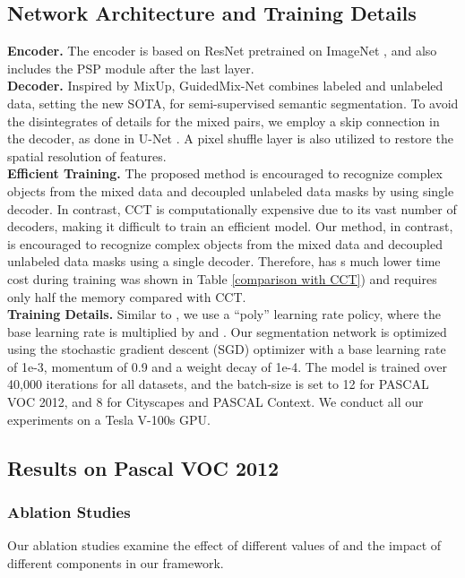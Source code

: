 \subsection{Network Architecture and Training Details}
\textbf{Encoder.} The encoder is based on ResNet \cite{he2016deep} pretrained on ImageNet \cite{krizhevsky2012imagenet}, and also includes the PSP module \cite{zhao2017pyramid} after the last layer.
\\\textbf{Decoder.} Inspired by MixUp, GuidedMix-Net combines labeled and unlabeled data, setting the new SOTA, for semi-supervised semantic segmentation. 
To avoid the disintegrates of details for the mixed pairs, we employ a skip connection in the decoder, as done in U-Net \cite{Ronneberger2015UNetCN}.
A pixel shuffle layer \cite{shi2016real} is also utilized to restore the spatial resolution of features.
\\\textbf{Efficient Training.} The proposed method is encouraged to recognize complex objects from the mixed data and decoupled unlabeled data masks by using single decoder.
In contrast, CCT \cite{ouali2020semi} is computationally expensive due to its vast number of decoders, making it difficult to train an efficient model. 
Our method, in contrast, is encouraged to recognize complex objects from the mixed data and decoupled unlabeled data masks using a single decoder.
Therefore, has s much lower time cost during training was shown in Table \ref{comparison with CCT}) and requires only half the memory compared with CCT.
\\\textbf{Training Details.}
Similar to \cite{chen2017deeplab}, we use a ``poly'' learning rate policy, where the base learning rate is multiplied by  and . 
Our segmentation network is optimized using the stochastic gradient descent (SGD) optimizer with a base learning rate of 1e-3, momentum of 0.9 and a weight decay of 1e-4.
The model is trained over 40,000 iterations for all datasets, and the batch-size is set to 12 for PASCAL VOC 2012, and 8 for Cityscapes and PASCAL Context. 
We conduct all our experiments on a Tesla V-100s GPU.

\subsection{Results on Pascal VOC 2012}
\subsubsection{Ablation Studies} 
Our ablation studies examine the effect of different values of  and the impact of different components in our framework.

